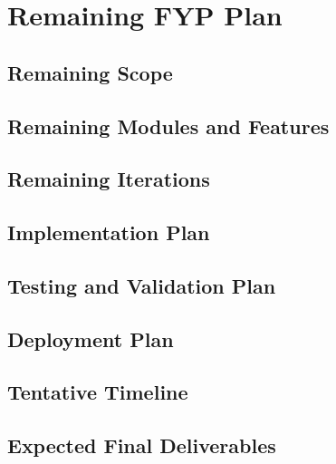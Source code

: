 \chapter{Remaining FYP Plan}
\section{Remaining Scope}
\section{Remaining Modules and Features}
\section{Remaining Iterations}
\section{Implementation Plan}
\section{Testing and Validation Plan}
\section{Deployment Plan}
\section{Tentative Timeline}
\section{Expected Final Deliverables}

